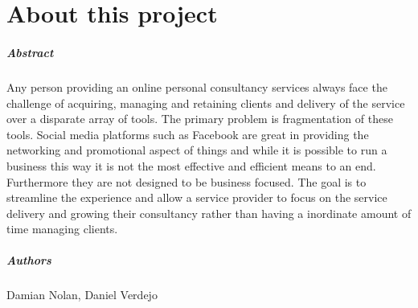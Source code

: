 
\chapter*{About this project}
\paragraph{Abstract}

Any person providing an online personal consultancy services always face the challenge of acquiring, managing and retaining clients and delivery of the service over a disparate array of tools.  The primary problem is fragmentation of these tools.  Social media platforms such as Facebook are great in providing the networking and promotional aspect of things and while it is possible to run a business this way it is not the most effective and efficient means to an end.  Furthermore they are not designed to be business focused.
The goal is to streamline the experience and allow a service provider to focus on the service delivery and growing their consultancy rather than having a inordinate amount of time managing clients. 

\paragraph{Authors}
Damian Nolan, Daniel Verdejo








